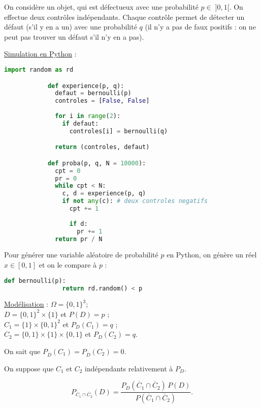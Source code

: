 \begin{exm}
	On considère un objet, qui est défectueux avec une probabilité $p \in \;]0,1[$. On effectue deux contrôles indépendants. Chaque contrôle permet de détecter un défaut (s'il y en a un) avec une probabilité $q$ (il n'y a pas de faux positifs : on ne peut pas trouver un défaut s'il n'y en a pas).


	\underline{\sc Simulation en Python} :
	\begin{algorithm}
		\begin{lstlisting}[language=python]
			import random as rd

			def experience(p, q):
			  defaut = bernoulli(p)
			  controles = [False, False]
			
			  for i in range(2):
			    if defaut:
			      controles[i] = bernoulli(q)

			  return (controles, defaut)

			def proba(p, q, N = 10000):
			  cpt = 0
			  pr = 0
			  while cpt < N:
			    c, d = experience(p, q)
			    if not any(c): # deux controles negatifs
			      cpt += 1
			
			      if d:
			        pr += 1
			  return pr / N
		\end{lstlisting}
	\end{algorithm}

	\begin{mdframed}
		Pour générer une variable aléatoire de probabilité $p$ en Python, on génère un réel $x \in [0,1]$ et on le compare à $p$ :
		\begin{lstlisting}[language=python]
			def bernoulli(p):
				return rd.random() < p
		\end{lstlisting}
	\end{mdframed}

	\underline{\sc Modélisation} : $\Omega = \{0,1\}^3$;\\ $D = \{0,1\}^2 \times \{1\}$ et $P(D) = p$ ;\\ $C_1 = \{1\} \times \{0,1\}^2$ et $P_D(C_1) = q$ ;\\ $C_2 = \{0,1\} \times \{1\} \times \{0,1\}$ et $P_D(C_2) = q$.

	On sait que $P_{\overline{D}}(C_1) = P_{\overline{D}}(C_2) = 0$.

	On suppose que $C_1$ et $C_2$ indépendants relativement à $P_D$.

	\[
		P_{\overline{C}_1 \cap \overline{C}_2}(D) = \frac{P_D\left( \overline{C}_1 \cap \overline{C}_2 \right) \, P(D)}{P\left( \overline{C}_1 \cap \overline{C}_2 \right)}.
	\] 


\end{exm}
